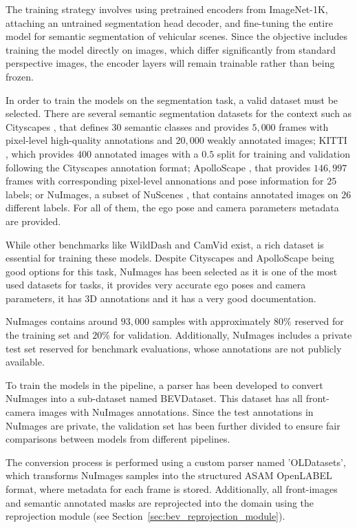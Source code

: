 The training strategy involves using pretrained encoders from ImageNet-1K, attaching an untrained segmentation head decoder, and fine-tuning the entire model for semantic segmentation of vehicular scenes. Since the objective includes training the model directly on  images, which differ significantly from standard perspective images, the encoder layers will remain trainable rather than being frozen.

 \label{sec:BEVDataset}
In order to train the models on the segmentation task, a valid dataset must be selected. There are several semantic segmentation datasets for the  context such as Cityscapes \cite{Cityscapes}, that defines $30$ semantic classes and provides $5,000$ frames with pixel-level high-quality annotations and $20,000$ weakly annotated images; KITTI \cite{KITTI}, which provides $400$ annotated images with a $0.5$ split for training and validation following the Cityscapes annotation format; ApolloScape \cite{ApolloScape}, that provides $146,997$ frames with corresponding pixel-level annonations and pose information for $25$ labels; or NuImages, a subset of NuScenes \cite{nuscenes}, that contains annotated images on $26$ different labels. For all of them, the ego pose and camera parameters metadata are provided. 

While other benchmarks like WildDash \cite{WildDash} and CamVid \cite{CamVid} exist, a rich dataset is essential for training these models. Despite Cityscapes and ApolloScape being good options for this task, NuImages has been selected as it is one of the most used datasets for  tasks, it provides very accurate ego poses and camera parameters, it has 3D annotations and it has a very good documentation.

NuImages contains around $93,000$ samples with approximately $80\%$ reserved for the training set and $20\%$ for validation. Additionally, NuImages includes a private test set reserved for benchmark evaluations, whose annotations are not publicly available.

To train the models in the pipeline, a parser has been developed to convert NuImages into a sub-dataset named BEVDataset. This dataset has all front-camera images with NuImages annotations. Since the test annotations in NuImages are private, the validation set has been further divided to ensure fair comparisons between models from different pipelines.

The conversion process is performed using a custom parser named 'OLDatasets', which transforms NuImages samples into the structured ASAM OpenLABEL format, where metadata for each frame is stored. Additionally, all front-images and semantic annotated masks are reprojected into the  domain using the  reprojection module (see Section~\ref{sec:bev_reprojection_module}).

